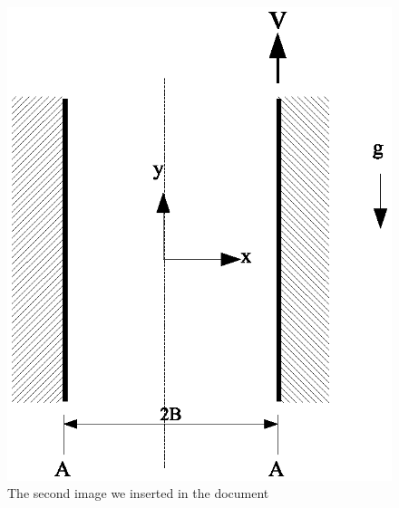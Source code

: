 \documentclass[a4paper, 12pt]{article}
\begin{document}
\begin{figure}[h]
	\begin{center}
		\includegraphics[scale=0.5]{schematic1.eps}
	\end{center}
	\caption{The second image we inserted in the document}
	\label{f2}
\end{figure}
\end{document}
